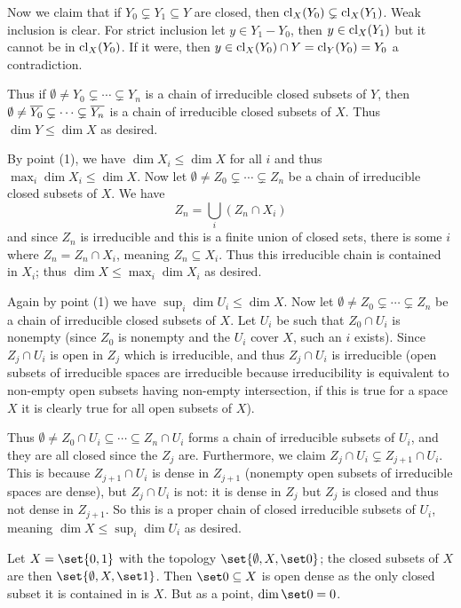     Now we claim that if $Y_0\subsetneq Y_1\subseteq Y$ are closed, then ${\rm cl}_X(Y_0)\subsetneq{\rm cl}_X(Y_1)$.
    Weak inclusion is clear.
    For strict inclusion let $y\in Y_1-Y_0$, then $y\in{\rm cl}_X(Y_1)$ but it cannot be in ${\rm cl}_X(Y_0)$.
    If it were, then $y\in{\rm cl}_X(Y_0)\cap Y={\rm cl}_Y(Y_0)=Y_0$ a contradiction.

    Thus if $\emptyset\neq Y_0\subsetneq\cdots\subsetneq Y_n$ is a chain of irreducible closed subsets of $Y$, then $\emptyset\neq{\overline{Y_0}}\subsetneq\cdots\subsetneq{\overline{Y_n}}$
    is a chain of irreducible closed subsets of $X$.
    Thus $\dim Y\leq\dim X$ as desired.

    \item By point (1), we have $\dim X_i\leq\dim X$ for all $i$ and thus $\max_i\dim X_i\leq\dim X$.
    Now let $\emptyset\neq Z_0\subsetneq\cdots\subsetneq Z_n$ be a chain of irreducible closed subsets of $X$.
    We have
    $$ Z_n = \bigcup_i(Z_n\cap X_i) $$
    and since $Z_n$ is irreducible and this is a finite union of closed sets, there is some $i$ where $Z_n=Z_n\cap X_i$, meaning $Z_n\subseteq X_i$.
    Thus this irreducible chain is contained in $X_i$; thus $\dim X\leq\max_i\dim X_i$ as desired.

    \item Again by point (1) we have $\sup_i\dim U_i\leq\dim X$.
    Now let $\emptyset\neq Z_0\subsetneq\cdots\subsetneq Z_n$ be a chain of irreducible closed subsets of $X$.
    Let $U_i$ be such that $Z_0\cap U_i$ is nonempty (since $Z_0$ is nonempty and the $U_i$ cover $X$, such an $i$ exists).
    Since $Z_j\cap U_i$ is open in $Z_j$ which is irreducible, and thus $Z_j\cap U_i$ is irreducible (open subsets of irreducible spaces are irreducible because irreducibility is equivalent
    to non-empty open subsets having non-empty intersection, if this is true for a space $X$ it is clearly true for all open subsets of $X$).

    Thus $\emptyset\neq Z_0\cap U_i\subseteq\cdots\subseteq Z_n\cap U_i$ forms a chain of irreducible subsets of $U_i$, and they are all closed since the $Z_j$ are.
    Furthermore, we claim $Z_j\cap U_i\subsetneq Z_{j+1}\cap U_i$.
    This is because $Z_{j+1}\cap U_i$ is dense in $Z_{j+1}$ (nonempty open subsets of irreducible spaces are dense), but $Z_j\cap U_i$ is not: it is dense in $Z_j$ but $Z_j$ is closed and thus
    not dense in $Z_{j+1}$.
    So this is a proper chain of closed irreducible subsets of $U_i$, meaning $\dim X\leq\sup_i\dim U_i$ as desired.

    \item Let $X=\set{0,1}$ with the topology $\set{\emptyset,X,\set0}$; the closed subsets of $X$ are then $\set{\emptyset,X,\set1}$.
    Then $\set 0\subseteq X$ is open dense as the only closed subset it is contained in is $X$.
    But as a point, $\dim\set0=0$.


